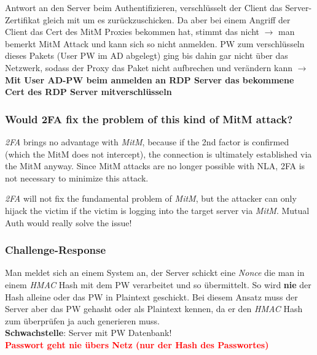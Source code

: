 Antwort an den Server beim Authentifizieren, verschlüsselt der Client das Server-Zertifikat gleich mit um es zurückzuschicken.
Da aber bei einem Angriff der Client das Cert des MitM Proxies bekommen hat, stimmt das nicht $\rightarrow$ man bemerkt MitM Attack und kann sich so nicht anmelden. 
PW zum verschlüsseln dieses Pakets (User PW im AD abgelegt) ging bis dahin gar nicht über das Netzwerk, sodass der Proxy das Paket nicht aufbrechen und verändern kann
$\rightarrow$ \textbf{Mit User AD-PW beim anmelden an RDP Server das bekommene Cert des RDP Server mitverschlüsseln}

\subsubsection{Would 2FA fix the problem of this kind of MitM attack?}
\textit{2FA} brings no advantage with \textit{MitM}, because if the 2nd factor is confirmed (which the MitM does not intercept), the connection is ultimately established via the MitM anyway.
Since MitM attacks are no longer possible with NLA, 2FA is not necessary to minimize this attack.

\textit{2FA} will not fix the fundamental problem of \textit{MitM}, but the attacker can only hijack the victim if the victim is logging into the target server via \textit{MitM}. Mutual Auth would really solve the issue!

\subsubsection{Challenge-Response}
Man meldet sich an einem System an, der Server schickt eine \textit{Nonce} die man in einem \textit{HMAC} Hash mit dem PW verarbeitet und so übermittelt.
So wird \textbf{nie} der Hash alleine oder das PW in Plaintext geschickt. 
Bei diesem Ansatz muss der Server aber das PW gehasht oder als Plaintext kennen, da er den \textit{HMAC} Hash zum überprüfen ja auch generieren muss.\\
\textbf{Schwachstelle}: Server mit PW Datenbank!\\

\textcolor{red}{\textbf{Passwort geht nie übers Netz (nur der Hash des Passwortes)}}\\

